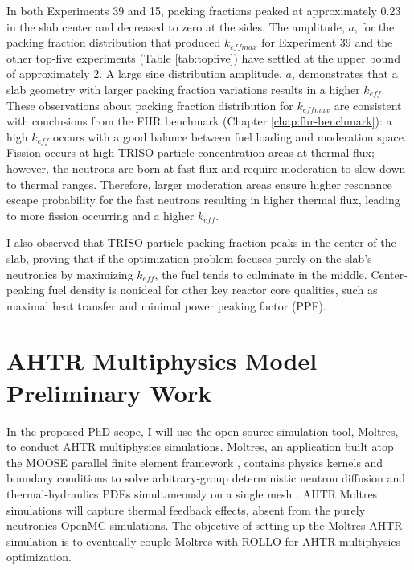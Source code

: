 In both Experiments 39 and 15, packing fractions peaked at approximately 
0.23 in the slab center and decreased to zero at the sides.  
The amplitude, $a$, for the packing fraction distribution that produced $k_{eff max}$ 
for Experiment 39 and the other top-five experiments (Table \ref{tab:topfive}) 
have settled at the upper bound of approximately 2. 
A large sine distribution amplitude, $a$, demonstrates that a slab geometry 
with larger packing fraction variations results in a higher $k_{eff}$. 
These observations about packing fraction distribution for $k_{eff max}$ are 
consistent with conclusions from the \gls{FHR} benchmark (Chapter 
\ref{chap:fhr-benchmark}): a high $k_{eff}$ occurs with a good balance between 
fuel loading and moderation space. 
Fission occurs at high \gls{TRISO} particle concentration areas at thermal flux;
however, the neutrons are born at fast flux and require moderation to slow down 
to thermal ranges.
Therefore, larger moderation areas ensure higher resonance escape probability for 
the fast neutrons resulting in higher thermal flux, leading to more 
fission occurring and a higher $k_{eff}$. 

I also observed that \gls{TRISO} particle packing fraction peaks in the center 
of the slab, proving that if the optimization problem focuses purely on the 
slab's neutronics by maximizing $k_{eff}$, the fuel tends to culminate in the 
middle. 
Center-peaking fuel density is nonideal for other key reactor core 
qualities, such as maximal heat transfer and minimal power peaking factor (PPF).

\section{AHTR Multiphysics Model Preliminary Work}
\label{sec:multiphysics_homo}
In the proposed PhD scope, I will use the open-source simulation tool, Moltres, 
to conduct \gls{AHTR} multiphysics simulations. 
Moltres, an application built atop the \gls{MOOSE} parallel finite element 
framework \cite{gaston_moose:_2009}, contains physics kernels and boundary 
conditions to solve arbitrary-group deterministic neutron diffusion and 
thermal-hydraulics \glspl{PDE} simultaneously on a single mesh
\cite{lindsay_introduction_2018,park_advancement_2020}. 
\gls{AHTR} Moltres simulations will capture thermal feedback effects, absent
from the purely neutronics OpenMC simulations.  
The objective of setting up the Moltres \gls{AHTR} simulation is to eventually 
couple Moltres with \gls{ROLLO} for \gls{AHTR} multiphysics optimization. 

